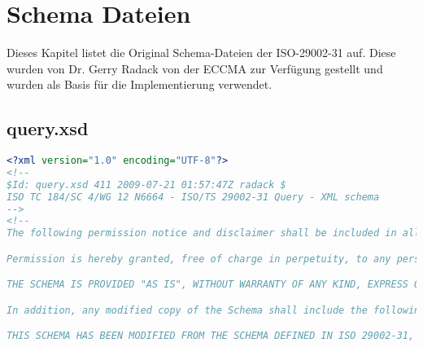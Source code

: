 
\chapter{Schema Dateien} \label{kap:anhang_schema}

Dieses Kapitel listet die Original Schema-Dateien der ISO-29002-31 auf. Diese wurden von Dr. Gerry Radack von der ECCMA zur Verfügung gestellt und wurden als Basis für die Implementierung verwendet. 

\section{query.xsd}\label{sec:query_xsd}

 \begin{lstlisting}[caption=query.xsd, language=XML, label=lst:query_xsd]
<?xml version="1.0" encoding="UTF-8"?>
<!--
$Id: query.xsd 411 2009-07-21 01:57:47Z radack $
ISO TC 184/SC 4/WG 12 N6664 - ISO/TS 29002-31 Query - XML schema
-->
<!--
The following permission notice and disclaimer shall be included in all copies of this XML schema ("the Schema"), and derivations of the Schema:

Permission is hereby granted, free of charge in perpetuity, to any person obtaining a copy of the Schema, to use, copy, modify, merge and distribute free of charge, copies of the Schema for the purposes of developing, implementing, installing and using software based on the  Schema, and to permit persons to whom the Schema is furnished to do so, subject to the following conditions:

THE SCHEMA IS PROVIDED "AS IS", WITHOUT WARRANTY OF ANY KIND, EXPRESS OR IMPLIED, INCLUDING BUT NOT LIMITED TO THE WARRANTIES OF MERCHANTABILITY, FITNESS FOR A PARTICULAR PURPOSE AND NONINFRINGEMENT. IN NO EVENT SHALL THE AUTHORS OR COPYRIGHT HOLDERS BE LIABLE FOR ANY CLAIM, DAMAGES OR OTHER LIABILITY, WHETHER IN AN ACTION OF CONTRACT, TORT OR OTHERWISE, ARISING FROM, OUT OF OR IN CONNECTION WITH THE SCHEMA OR THE USE OR OTHER DEALINGS IN THE SCHEMA.

In addition, any modified copy of the Schema shall include the following notice:

THIS SCHEMA HAS BEEN MODIFIED FROM THE SCHEMA DEFINED IN ISO 29002-31, AND SHOULD NOT BE INTERPRETED AS COMPLYING WITH THAT STANDARD.


\end{lstlisting}
